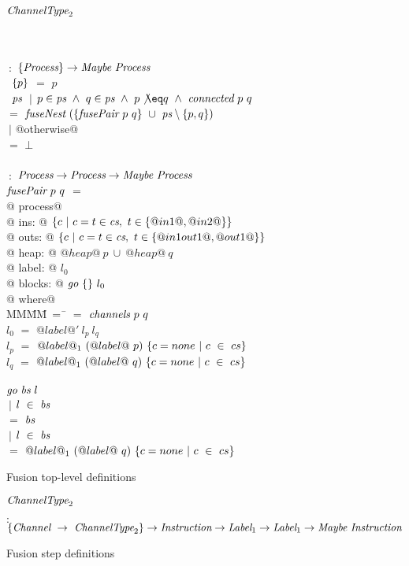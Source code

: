 \begin{figure}

\begin{tabbing}
$\textit{ChannelType}_2$   \TABDEF \kill

 \\
\\
 \> $~:$ \> $\{ \textit{Process} \} \to  \textit{Maybe}~\textit{Process}$ \\
~$\{ p \}$ \> $=$ \> $p$ \\
~$\textit{ps}$
    \> $~|$      \> $p \in \ti{ps} ~\wedge~ q \in \ti{ps} ~\wedge~ p \not\eq q ~\wedge~ \ti{connected}~p~q$ \\
    \> $=$ \> $\textit{fuseNest}~(\{ \textit{fusePair}~p~q \}~\cup~\textit{ps} \setminus \{ p,q \})$ \\
    \> $~|$      \> @otherwise@ \\
    \> $=$ \> $\bot$ \\
\\
 \> $~:$ \> $\textit{Process} \to \textit{Process} \to  \textit{Maybe}~\textit{Process}$ \\
$\textit{fusePair}~p~q$ \> $=$ \\
@    process@ \\
@        ins: @ $\{ c~|~c=t \in \textit{cs},~t \in \{ @in1@,@in2@ \} \} $ \\
@       outs: @ $\{ c~|~c=t \in \textit{cs},~t \in \{ @in1out1@,@out1@ \} \} $ \\
@       heap: @ $@heap@~p~\cup~@heap@~q$ \\
@      label: @ $l_0$ \\
@     blocks: @ $\textit{go}~\{  \}~l_0$ \\
@ where@ \\
MM\=MM\=~=~\=\kill
 \>  \> $=$ \> $\textit{channels}~p~q$ \\
 \> $l_0$   \> $=$ \> $@label@'~l_p~l_q$ \\
 \> $l_p$   \> $=$ \> $@label@_1~(@label@~p)~\{ c=none~|~c~\in~cs \}$ \\
 \> $l_q$   \> $=$ \> $@label@_1~(@label@~q)~\{ c=none~|~c~\in~cs \}$ \\
 \\
 \> $\textit{go}~\textit{bs}~l$ \\
 \> \> $~|$ \> $l~\in~\textit{bs}$ \\
 \> \> $=$  \> $\textit{bs}$ \\
 \> \> $~|$ \> $l~\in~\textit{bs}$ \\
 \> \> $=$ \> $@label@_1~(@label@~q)~\{ c=none~|~c~\in~cs \}$ \\
\end{tabbing}
\caption{Fusion top-level definitions}
\label{fig:Fusion:Def:Top}
\end{figure}
\begin{figure}

\begin{tabbing}
$\textit{ChannelType}_2$   \TABDEF \kill

 \> $:$ \> $\{\textit{Channel} ~\to~ \textit{ChannelType}_2\} \to \textit{Instruction} \to \textit{Label}_1 \to \textit{Label}_1 \to  \textit{Maybe}~\textit{Instruction}$ \\
\end{tabbing}

\caption{Fusion step definitions}
\label{fig:Fusion:Def:Step}
\end{figure}
